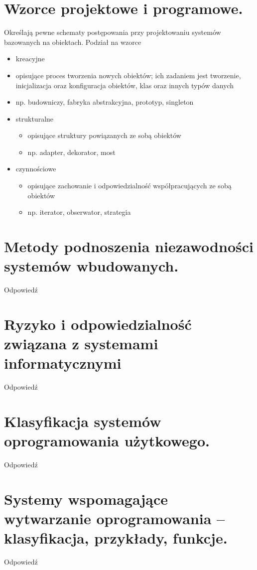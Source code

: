 \documentclass[12pt,a4paper]{article}
\begin{document}
	\section{Wzorce projektowe i programowe.}
	Określają pewne schematy postępowania przy projektowaniu systemów bazowanych na obiektach. Podział na wzorce
	\begin{itemize}
		\item kreacyjne
			\item opisujące proces tworzenia nowych obiektów; ich zadaniem jest tworzenie, inicjalizacja oraz konfiguracja obiektów, klas oraz innych typów danych
			\item np. budowniczy, fabryka abstrakcyjna, prototyp, singleton
		\item strukturalne
		\begin{itemize}
			\item opisujące struktury powiązanych ze sobą obiektów
			\item np. adapter, dekorator, most
		\end{itemize}
		\item czynnościowe
		\begin{itemize}
			\item opisujące zachowanie i odpowiedzialność współpracujących ze sobą obiektów
			\item np. iterator, obserwator, strategia
		\end{itemize}
	\end{itemize}

	\section{Metody podnoszenia niezawodności systemów wbudowanych.}
	Odpowiedź

	\section{Ryzyko i odpowiedzialność związana z systemami informatycznymi}
	Odpowiedź

	\section{Klasyfikacja systemów oprogramowania użytkowego.}
	Odpowiedź

	\section{Systemy wspomagające wytwarzanie oprogramowania – klasyfikacja, przykłady, funkcje.}
	Odpowiedź
\end{document}
